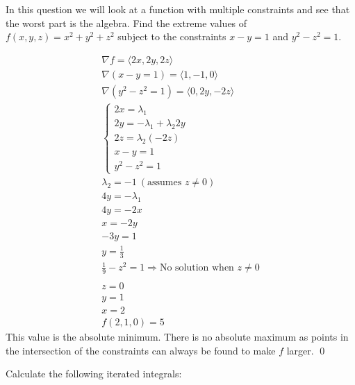 \documentclass[12pt]{exam}
\begin{document}
\begin{questions}
\begin{solution}
    \end{solution}
    \clearpage
\question In this question we will look at a function with multiple constraints and see that the worst part is the
algebra. Find the extreme values of $f (x, y, z) = x^2 + y^2 + z^2$ subject to the constraints $x - y = 1$ and $y^2 - z^2 = 1$.
    \begin{solution}
        \begin{gather*}
            \nabla f = \langle 2x, 2y, 2z \rangle \\
            \nabla (x - y = 1) = \langle 1, -1, 0 \rangle \\
            \nabla (y^2 - z^2 = 1) = \langle 0, 2y, -2z \rangle \\
            \begin{cases*}
                2x = \lambda_1 \\
                2y = -\lambda_1 + \lambda_2 2y \\
                2z = \lambda_2 (-2z) \\
                x - y = 1 \\
                y^2 - z^2 = 1
            \end{cases*}\\
            \lambda_2 = -1 \ (\text{assumes } z \neq 0)\\
            4y = -\lambda_1 \\
            4y = -2x \\
            x = -2y \\
            -3y = 1 \\
            y = \frac{1}{3} \\
            \frac{1}{9} - z^2 = 1 \Rightarrow\text{No solution when } z\neq 0 \\\\
            z = 0 \\
            y = 1 \\
            x = 2 \\
            \boxed{f(2, 1, 0) = 5}
        \end{gather*}
        This value is the absolute minimum. There is no absolute maximum as points in the intersection of the constraints can always be found to make $f$ larger. \qed
    \end{solution}
\clearpage
\question Calculate the following iterated integrals:
    \begin{parts}

\end{parts}
\end{questions}
\end{document}
